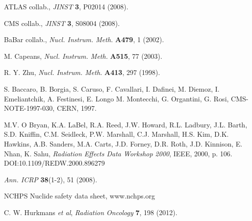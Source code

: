 \documentclass[twoside,a4paper]{article}
\begin{document}
%
%
\begin{thebibliography}{}

 ATLAS collab.,
  {\em JINST} {\bf 3}, P02014 (2008).

 CMS collab.,
  {\em JINST} {\bf 3}, S08004 (2008).

 BaBar collab.,
  {\em  Nucl. Instrum. Meth.} {\bf A479}, 1 (2002).


 M. Capeans,
  {\em Nucl. Instrum. Meth.} {\bf A515}, 77 (2003).

 R. Y. Zhu,
  {\em Nucl. Instrum. Meth.} {\bf A413}, 297 (1998).

 S. Baccaro, B. Borgia, S. Caruso, F. Cavallari, I. Dafinei, M. Diemoz, I. Emeliantchik, A. Festinesi, E. Longo M. Montecchi, G. Organtini, G. Rosi,
  CMS-NOTE-1997-030, CERN, 1997.

M.V. O Bryan, K.A. LaBel, R.A.  Reed, J.W.  Howard,  R.L. Ladbury, J.L. Barth, S.D. Kniffin,  C.M. Seidleck, P.W. Marshall, C.J. Marshall, H.S. Kim, D.K. Hawkins, A.B. Sanders, M.A. Carts, J.D. Forney, D.R. Roth, J.D. Kinnison, E. Nhan, K. Sahu, 
{\em Radiation Effects Data Workshop 2000}, IEEE, 2000, p. 106. DOI:10.1109/REDW.2000.896279

 {\em Ann. ICRP} {\bf 38}(1-2), 51 (2008).

 NCHPS Nuclide safety data sheet, www.nchps.org 

 C. W. Hurkmans {\it et al},
  {\em Radiation Oncology} {\bf 7}, 198 (2012).




\end{thebibliography}
\end{document}
